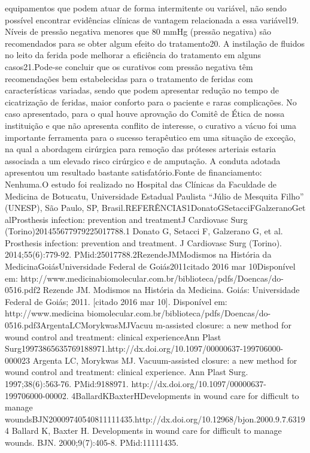 \documentclass[numberinsection,times,10pt,spreadimages]{memoir}
\begin{document}
equipamentos que podem atuar de forma intermitente ou variável, não sendo
possível
encontrar evidências clínicas de vantagem relacionada a essa variável19. Níveis
de pressão negativa
menores que 80 mmHg (pressão negativa) são recomendados para se obter algum
efeito
do tratamento20. A instilação de
fluidos no leito da ferida pode melhorar a eficiência do tratamento em alguns
casos21.Pode-se concluir que os curativos com pressão negativa têm recomendações
bem
estabelecidas para o tratamento de feridas com características variadas, sendo
que
podem apresentar redução no tempo de cicatrização de feridas, maior conforto
para o
paciente e raras complicações. No caso apresentado, para o qual houve aprovação
do
Comitê de Ética de nossa instituição e que não apresenta conflito de interesse,
o
curativo a vácuo foi uma importante ferramenta para o sucesso terapêutico em uma
situação de exceção, na qual a abordagem cirúrgica para remoção das próteses
arteriais estaria associada a um elevado risco cirúrgico e de amputação. A
conduta
adotada apresentou um resultado bastante satisfatório.Fonte de financiamento:
Nenhuma.O estudo foi realizado no Hospital das Clínicas da Faculdade de Medicina
de
Botucatu, Universidade Estadual Paulista “Júlio de Mesquita Filho” (UNESP), São
Paulo, SP, Brasil.REFERÊNCIAS1DonatoGSetacciFGalzeranoGet alProsthesis
infection: prevention and treatmentJ Cardiovasc Surg
(Torino)201455677979225017788.1 Donato G, Setacci F, Galzerano G, et al.
Prosthesis infection:
prevention and treatment. J Cardiovasc Surg (Torino). 2014;55(6):779-92.
PMid:25017788.2RezendeJMModismos na História da MedicinaGoiásUniversidade
Federal de Goiás2011citado 2016 mar 10Disponível em:
http://www.medicinabiomolecular.com.br/biblioteca/pdfs/Doencas/do-0516.pdf2
Rezende JM. Modismos na História da Medicina. Goiás: Universidade
Federal de Goiás; 2011. [citado 2016 mar 10]. Disponível em: http://www.medicina
biomolecular.com.br/biblioteca/pdfs/Doencas/do-0516.pdf3ArgentaLCMorykwasMJVacuu
m-assisted closure: a new method for wound control and
treatment: clinical experienceAnn Plast
Surg19973865635769188971.http://dx.doi.org/10.1097/00000637-199706000-000023
Argenta LC, Morykwas MJ. Vacuum-assisted closure: a new method for
wound control and treatment: clinical experience. Ann Plast Surg.
1997;38(6):563-76. PMid:9188971.
http://dx.doi.org/10.1097/00000637-199706000-00002.
4BallardKBaxterHDevelopments in wound care for difficult to manage
woundsBJN20009740540811111435.http://dx.doi.org/10.12968/bjon.2000.9.7.63194
Ballard K, Baxter H. Developments in wound care for difficult to
manage wounds. BJN. 2000;9(7):405-8. PMid:11111435.
\end{document}
